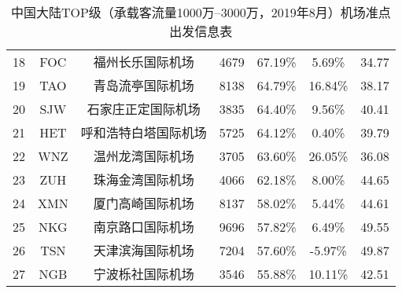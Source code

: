 \begin{table}
{\begin{tabular}{ccccccc}
            18 & FOC & 福州长乐国际机场 & 4679 & 67.19\% & 5.69\% & 34.77 \\
            \rowcolor[HTML]{EFEFEF}
            19 & TAO & 青岛流亭国际机场 & 8138 & 64.79\% & 16.84\% & 38.17 \\
            20 & SJW & 石家庄正定国际机场 & 3835 & 64.40\% & 9.56\% & 40.41 \\
            \rowcolor[HTML]{EFEFEF}
            21 & HET & 呼和浩特白塔国际机场 & 5725 & 64.12\% & 0.40\% & 39.79 \\
            22 & WNZ & 温州龙湾国际机场 & 3705 & 63.60\% & 26.05\% & 36.08 \\
            \rowcolor[HTML]{EFEFEF}
            23 & ZUH & 珠海金湾国际机场 & 4066 & 62.18\% & 8.00\% & 44.65 \\
            24 & XMN & 厦门高崎国际机场 & 8137 & 58.02\% & 5.44\% & 44.61 \\
            \rowcolor[HTML]{EFEFEF}
            25 & NKG & 南京路口国际机场 & 9696 & 57.82\% & 6.49\% & 49.55 \\
            26 & TSN & 天津滨海国际机场 & 7204 & 57.60\% & -5.97\% & 49.87 \\
            \rowcolor[HTML]{EFEFEF}
            27 & NGB & 宁波栎社国际机场 & 3546 & 55.88\% & 10.11\% & 42.51 \\ \hline
        \end{tabular}%
    }
    \caption{中国大陆TOP级（承载客流量1000万--3000万，2019年8月）机场准点出发信息表}\label{T:depart_1_2}
\end{table}


